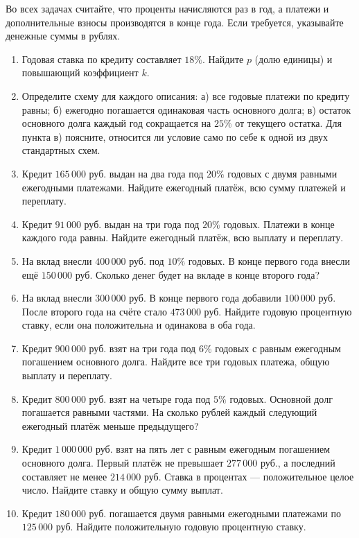\documentclass[a4paper,12pt]{article}
\begin{document}
Во всех задачах считайте, что проценты начисляются раз в год, а платежи и дополнительные взносы производятся в конце года. Если требуется, указывайте денежные суммы в рублях.

\begin{enumerate}
\item Годовая ставка по кредиту составляет $18\%$. Найдите $p$ (долю единицы) и повышающий коэффициент $k$.

\item Определите схему для каждого описания: а) все годовые платежи по кредиту равны; б) ежегодно погашается одинаковая часть основного долга; в) остаток основного долга каждый год сокращается на $25\%$ от текущего остатка. Для пункта в) поясните, относится ли условие само по себе к одной из двух стандартных схем.

\item Кредит $165\,000$ руб. выдан на два года под $20\%$ годовых с двумя равными ежегодными платежами. Найдите ежегодный платёж, всю сумму платежей и переплату.

\item Кредит $91\,000$ руб. выдан на три года под $20\%$ годовых. Платежи в конце каждого года равны. Найдите ежегодный платёж, всю выплату и переплату.

\item На вклад внесли $400\,000$ руб. под $10\%$ годовых. В конце первого года внесли ещё $150\,000$ руб. Сколько денег будет на вкладе в конце второго года?

\item На вклад внесли $300\,000$ руб. В конце первого года добавили $100\,000$ руб. После второго года на счёте стало $473\,000$ руб. Найдите годовую процентную ставку, если она положительна и одинакова в оба года.

\item Кредит $900\,000$ руб. взят на три года под $6\%$ годовых с равным ежегодным погашением основного долга. Найдите все три годовых платежа, общую выплату и переплату.

\item Кредит $800\,000$ руб. взят на четыре года под $5\%$ годовых. Основной долг погашается равными частями. На сколько рублей каждый следующий ежегодный платёж меньше предыдущего?

\item Кредит $1\,000\,000$ руб. взят на пять лет с равным ежегодным погашением основного долга. Первый платёж не превышает $277\,000$ руб., а последний составляет не менее $214\,000$ руб. Ставка в процентах --- положительное целое число. Найдите ставку и общую сумму выплат.

\item Кредит $180\,000$ руб. погашается двумя равными ежегодными платежами по $125\,000$ руб. Найдите положительную годовую процентную ставку.
\end{enumerate}
\end{document}
